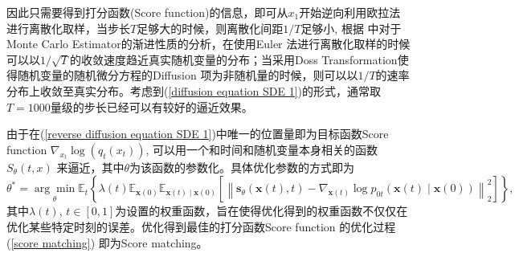因此只需要得到打分函数(Score function)的信息，即可从$x_1$开始逆向利用欧拉法进行离散化取样，当步长$T$足够大的时候，则离散化间距$1/T$足够小, 根据 
\cite{detemple}中对于Monte Carlo Estimator的渐进性质的分析，在使用Euler 法进行离散化取样的时候可以以$1/\sqrt{T}$的收敛速度趋近真实随机变量的分布；当采用Doss Transformation使得随机变量的随机微分方程的Diffusion 项为非随机量的时候，则可以以$1/T$的速率分布上收敛至真实分布。考虑到(\ref{diffusion equation SDE 1})的形式，通常取$T=1000$量级的步长已经可以有较好的逼近效果。      

由于在(\ref{reverse diffusion equation SDE 1})中唯一的位置量即为目标函数Score function $\nabla_{x_t}\log(q_t(x_t))$, 可以用一个和时间和随机变量本身相关的函数$S_{\theta}(t,x)$ 来逼近，其中$\theta$为该函数的参数化。具体优化参数的方式即为
\begin{equation}
{\theta}^*=\underset{{\theta}}{\arg \min } \mathbb{E}_t\left\{\lambda(t) \mathbb{E}_{\mathbf{x}(0)} \mathbb{E}_{\mathbf{x}(t) \mid \mathbf{x}(0)}\left[\left\|\mathbf{s}_{{\theta}}(\mathbf{x}(t), t)-\nabla_{\mathbf{x}(t)} \log p_{0 t}(\mathbf{x}(t) \mid \mathbf{x}(0))\right\|_2^2\right]\right\},
\label{score matching}
\end{equation}
其中$\lambda(t)$, $t\in [0,1]$为设置的权重函数，旨在使得优化得到的权重函数不仅仅在优化某些特定时刻的误差。优化得到最佳的打分函数Score function 的优化过程 (\ref{score matching}) 即为Score matching。    


